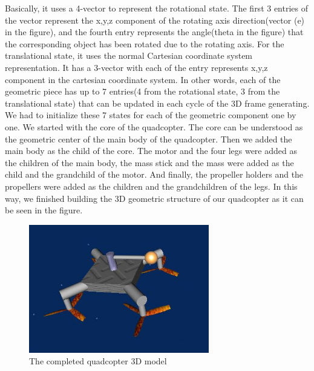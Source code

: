 \newline 
Basically, it uses a 4-vector to represent the rotational state. The first 3 entries of the vector represent the x,y,z component of the rotating axis direction(vector (e) in the figure), and the fourth entry represents the angle(theta in the figure) that the corresponding object has been rotated due to the rotating axis.
\newline
\newline
For the translational state, it uses the normal Cartesian coordinate system representation. It has a 3-vector with each of the entry represents x,y,z component in the cartesian coordinate system. 
\newline
\newline
In other words, each of the geometric piece has up to 7 entries(4 from the rotational state, 3 from the translational state) that can be updated in each cycle of the 3D frame generating.
\newline
\newline
We had to initialize these 7 states for each of the geometric component one by one. We started with the core of the quadcopter. The core can be understood as the geometric center of the main body of the quadcopter. Then we added the main body as the child of the core. The motor and the four legs were added as the children of the main body, the mass stick and the mass were added as the child and the grandchild of the motor. 
\newline
\newline
And finally, the propeller holders and the propellers were added as the children and the grandchildren of the legs. In this way, we finished building the 3D geometric structure of our quadcopter as it can be seen in the figure.

\begin{figure}[h]
\centering
\includegraphics[width=0.7\textwidth]{./Lin_img/3.JPG}
\caption{The completed quadcopter 3D model}
\end{figure}


